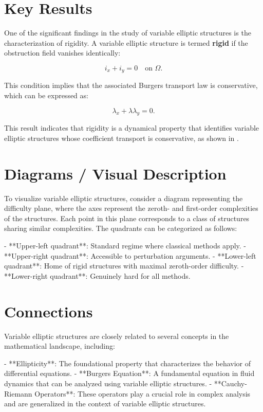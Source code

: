 \documentclass[11pt,a4paper]{article}
\begin{document}
\section{Key Results}
One of the significant findings in the study of variable elliptic structures is the characterization of rigidity. A variable elliptic structure is termed \textbf{rigid} if the obstruction field vanishes identically:

\begin{equation}
i_x + i_y = 0 \quad \text{on } \Omega.
\end{equation}

This condition implies that the associated Burgers transport law is conservative, which can be expressed as:

\begin{equation}
\lambda_x + \lambda \lambda_y = 0.
\end{equation}

This result indicates that rigidity is a dynamical property that identifies variable elliptic structures whose coefficient transport is conservative, as shown in \cite{2601.19274}.

\section{Diagrams / Visual Description}
To visualize variable elliptic structures, consider a diagram representing the difficulty plane, where the axes represent the zeroth- and first-order complexities of the structures. Each point in this plane corresponds to a class of structures sharing similar complexities. The quadrants can be categorized as follows:

- **Upper-left quadrant**: Standard regime where classical methods apply.
- **Upper-right quadrant**: Accessible to perturbation arguments.
- **Lower-left quadrant**: Home of rigid structures with maximal zeroth-order difficulty.
- **Lower-right quadrant**: Genuinely hard for all methods.

\section{Connections}
Variable elliptic structures are closely related to several concepts in the mathematical landscape, including:

- **Ellipticity**: The foundational property that characterizes the behavior of differential equations.
- **Burgers Equation**: A fundamental equation in fluid dynamics that can be analyzed using variable elliptic structures.
- **Cauchy-Riemann Operators**: These operators play a crucial role in complex analysis and are generalized in the context of variable elliptic structures.
\end{document}
